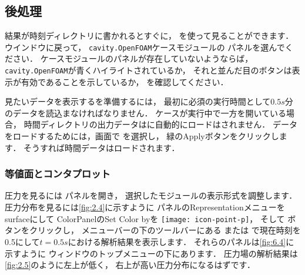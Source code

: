 \subsection{後処理}
\label{ssec:2.1.4}
結果が時刻ディレクトリに書かれるとすぐに，
を使って見ることができます．
ウインドウに戻って，
\texttt{cavity.OpenFOAM}ケースモジュールの
%
%
パネルを選んでください．
ケースモジュールのパネルが存在していないようならば，
\texttt{cavity.OpenFOAM}が青くハイライトされているか，
それと並んだ目のボタンは表示が有効であることを示しているか，
を確認してください．

見たいデータを表示するを準備するには，
最初に必須の実行時間として$0.5\unit{s}$分のデータを読込まなければなりません．
ケースが実行中で一方を開いている場合，
時間ディレクトリの出力データはに自動的にロードはされません．
データをロードするためには，画面で
%
%
を選択し，
緑のApplyボタンをクリックします． そうすれば時間データはロードされます．

\subsubsection{等値面とコンタプロット}
\label{sssec:2.1.4.1}
圧力を見るには
%
%
パネルを開き，
選択したモジュールの表示形式を調整します．
圧力分布を見るには\autoref{fig:2.4}に示すように
パネルのRepresentationメニューをsurfaceにして
ColorPanelのSet Color byを \texttt{[image: icon-point-p]}，
そして
%
%
ボタンをクリックし，
メニューバーの下のツールバーにある
%
%
または
%
%
で現在時刻を0.5にして$t = 0.5\unit{s}$における解析結果を表示します．
それらのパネルは\autoref{fig:6.4}に示すように
ウィンドウのトップメニューの下にあります．
圧力場の解析結果は\autoref{fig:2.5}のように左上が低く，
右上が高い圧力分布になるはずです．

